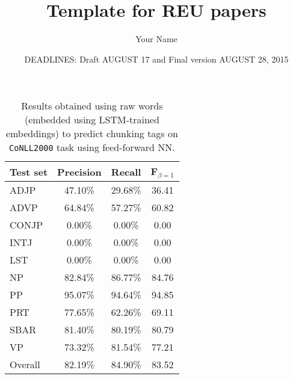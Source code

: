 \documentclass[psamsfonts]{amsart}
\title{Template for REU papers}
\author{Your Name}
\date{DEADLINES: Draft AUGUST 17 and Final version AUGUST 28, 2015}
\theoremstyle{definition}
\theoremstyle{remark}
\numberwithin{equation}{section}
\begin{document}
\begin{table}[t]
	\begin{center}
		\begin{tabular}{|l|c|c|c|}\cline{2-4}
			\multicolumn{1}{l|}{Test set}
        & Precision &  Recall  & F$_{\beta=1}$ \\\hline
        ADJP    &   47.10\% &  29.68\% &  36.41 \\
        ADVP    &   64.84\% &  57.27\% &  60.82 \\
        CONJP   &    0.00\% &   0.00\% &   0.00 \\
        INTJ    &    0.00\% &   0.00\% &   0.00 \\
        LST     &    0.00\% &   0.00\% &   0.00 \\
        NP      &   82.84\% &  86.77\% &  84.76 \\
        PP      &   95.07\% &  94.64\% &  94.85 \\
        PRT     &   77.65\% &  62.26\% &  69.11 \\
        SBAR    &   81.40\% &  80.19\% &  80.79 \\
        VP      &   73.32\% &  81.54\% &  77.21 \\\hline
        Overall &   82.19\% &  84.90\% &  83.52 \\\hline
\end{tabular}
\end{center}
\caption{
	Results obtained using raw words (embedded using LSTM-trained embeddings) to predict chunking tags on \texttt{CoNLL2000} task using feed-forward NN.
} 
\label{tab-final}
\end{table}
\end{document}
